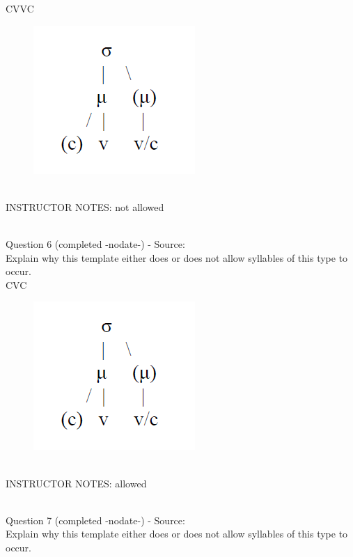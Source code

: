 \documentclass[12pt]{article}
\begin{document}
CVVC

\begin{figure}[H]
\includegraphics{../images/ponapean_syllabletemplate.png}
\end{figure}

~\\
INSTRUCTOR NOTES: not allowed


~\\

{\large Question 6} (completed -nodate-) - Source: \\

Explain why this template either does or does not allow syllables of this type to occur.\\

CVC

\begin{figure}[H]
\includegraphics{../images/ponapean_syllabletemplate.png}
\end{figure}

~\\
INSTRUCTOR NOTES: allowed


~\\

{\large Question 7} (completed -nodate-) - Source: \\

Explain why this template either does or does not allow syllables of this type to occur.\\
\end{document}
